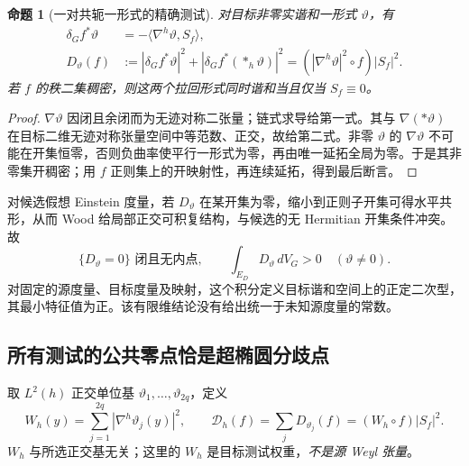 \documentclass[UTF8,fontset=fandol,zihao=-4,oneside,openany]{ctexbook}
\theoremstyle{cjkplain}
\newtheorem{proposition}[theorem]{命题}
\numberwithin{equation}{chapter}
\begin{document}
\begin{proposition}[一对共轭一形式的精确测试]\label{SUB:one-form-test}
对目标非零实谐和一形式 $\vartheta$，有
\begin{equation}\label{SUB:test-identity}
\begin{aligned}
\delta_Gf^*\vartheta&=-\langle\nabla^h\vartheta,S_f\rangle,\\
D_\vartheta(f)&:=|\delta_Gf^*\vartheta|^2+
|\delta_Gf^*(*_h\vartheta)|^2
=(|\nabla^h\vartheta|^2\circ f)|S_f|^2.
\end{aligned}
\end{equation}
若 $f$ 的秩二集稠密，则这两个拉回形式同时谐和当且仅当 $S_f\equiv0$。
\end{proposition}
\begin{proof}
$\nabla\vartheta$ 因闭且余闭而为无迹对称二张量；链式求导给第一式。其与 $\nabla(*\vartheta)$ 在目标二维无迹对称张量空间中等范数、正交，故给第二式。非零 $\vartheta$ 的 $\nabla\vartheta$ 不可能在开集恒零，否则负曲率使平行一形式为零，再由唯一延拓全局为零。于是其非零集开稠密；用 $f$ 正则集上的开映射性，再连续延拓，得到最后断言。
\end{proof}

对候选假想 Einstein 度量，若 $D_\vartheta$ 在某开集为零，缩小到正则子开集可得水平共形，从而 Wood 给局部正交可积复结构，与候选的无 Hermitian 开集条件冲突。故
\begin{equation}\label{SUB:candidate-test-positive}
\{D_\vartheta=0\}\text{ 闭且无内点},\qquad
\int_{E_D}D_\vartheta\,dV_G>0
\quad(\vartheta\ne0).
\end{equation}
对固定的源度量、目标度量及映射，这个积分定义目标谐和空间上的正定二次型，其最小特征值为正。该有限维结论没有给出统一于未知源度量的常数。

\subsection{所有测试的公共零点恰是超椭圆分歧点}

取 $L^2(h)$ 正交单位基 $\vartheta_1,\ldots,\vartheta_{2q}$，定义
\begin{equation}\label{SUB:complete-test}
W_h(y)=\sum_{j=1}^{2q}|\nabla^h\vartheta_j(y)|^2,
\qquad
\mathcal D_h(f)=\sum_jD_{\vartheta_j}(f)=(W_h\circ f)|S_f|^2.
\end{equation}
$W_h$ 与所选正交基无关；这里的 $W_h$ 是目标测试权重，\emph{不是源 Weyl 张量}。
\end{document}

